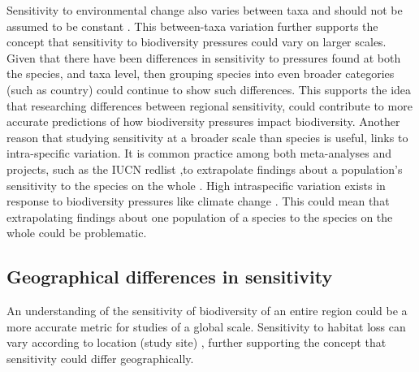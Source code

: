 \documentclass[11pt, a4paper, titlepage]{article}
\begin{document}
   	 Sensitivity to environmental change also varies between taxa and should not be assumed to be constant \citep{sunday2015species}. This between-taxa variation further supports the concept that sensitivity to biodiversity pressures could vary on larger scales. Given that there have been differences in sensitivity to pressures found at both the species, and taxa level, then grouping species into even broader categories (such as country) could continue to show such differences. This supports the idea that researching differences between regional sensitivity, could contribute to more accurate predictions of how biodiversity pressures impact biodiversity. Another reason that studying sensitivity at a broader scale than species is useful, links to intra-specific variation. It is common practice among both meta-analyses and projects, such as the IUCN redlist ,to extrapolate findings about a population's sensitivity to the species on the whole \citep{iucn2001iucn} \citep{buckley2012functional}. High intraspecific variation exists in response to biodiversity pressures like climate change \citep{mclean2018high} \citep{both2004large} \citep{mayor2016assessing}. This could mean that extrapolating findings about one population of a species to the species on the whole could be problematic. \newline
   	 
   	 
   	 \subsection*{Geographical differences in sensitivity}
   	 An understanding of the sensitivity of biodiversity of an entire region could be a more accurate metric for studies of a global scale. Sensitivity to habitat loss can vary according to location (study site) \citep{mayor2016assessing}, further supporting the concept that sensitivity could differ geographically. \newline
   	 
\end{document}
